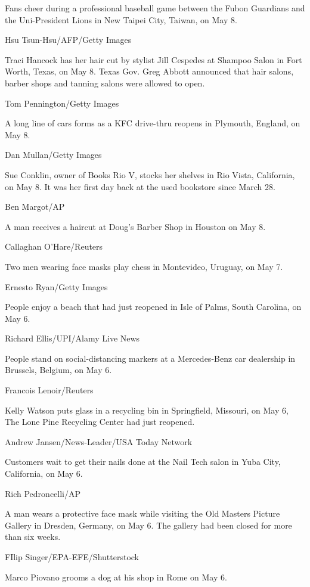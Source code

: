 Fans cheer during a professional baseball game between the Fubon
Guardians and the Uni-President Lions in New Taipei City, Taiwan, on May
8.

Hsu Tsun-Hsu/AFP/Getty Images

Traci Hancock has her hair cut by stylist Jill Cespedes at Shampoo Salon
in Fort Worth, Texas, on May 8. Texas Gov. Greg Abbott announced that
hair salons, barber shops and tanning salons were allowed to open.

Tom Pennington/Getty Images

A long line of cars forms as a KFC drive-thru reopens in Plymouth,
England, on May 8.

Dan Mullan/Getty Images

Sue Conklin, owner of Books Rio V, stocks her shelves in Rio Vista,
California, on May 8. It was her first day back at the used bookstore
since March 28.

Ben Margot/AP

A man receives a haircut at Doug's Barber Shop in Houston on May 8.

Callaghan O'Hare/Reuters

Two men wearing face masks play chess in Montevideo, Uruguay, on May 7.

Ernesto Ryan/Getty Images

People enjoy a beach that had just reopened in Isle of Palms, South
Carolina, on May 6.

Richard Ellis/UPI/Alamy Live News

People stand on social-distancing markers at a Mercedes-Benz car
dealership in Brussels, Belgium, on May 6.

Francois Lenoir/Reuters

Kelly Watson puts glass in a recycling bin in Springfield, Missouri, on
May 6, The Lone Pine Recycling Center had just reopened.

Andrew Jansen/News-Leader/USA Today Network

Customers wait to get their nails done at the Nail Tech salon in Yuba
City, California, on May 6.

Rich Pedroncelli/AP

A man wears a protective face mask while visiting the Old Masters
Picture Gallery in Dresden, Germany, on May 6. The gallery had been
closed for more than six weeks.

FIlip Singer/EPA-EFE/Shutterstock

Marco Piovano grooms a dog at his shop in Rome on May 6.

